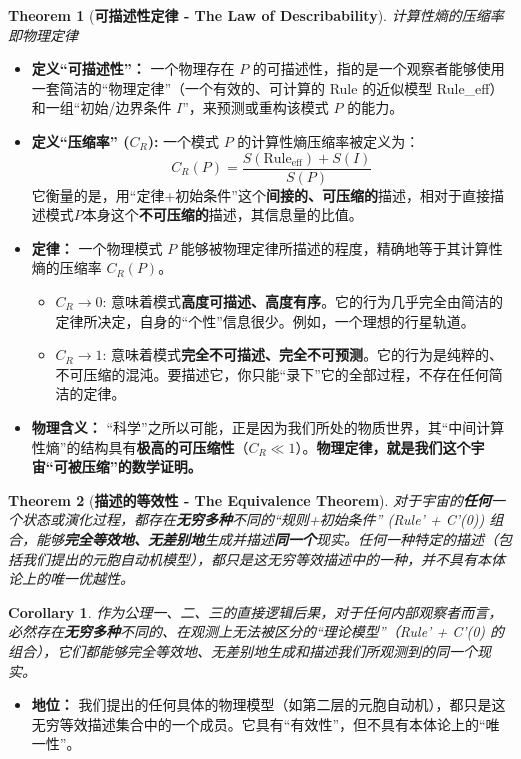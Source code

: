 \documentclass[11pt, a4paper]{article}
\newtheorem{theorem}{Theorem}[section]
\newtheorem{corollary}{Corollary}[section]
\begin{document}
\begin{theorem}[\textbf{可描述性定律 - The Law of Describability}]
计算性熵的压缩率即物理定律
\end{theorem}
\begin{itemize}
    \item \textbf{定义“可描述性”：} 一个物理存在 $P$ 的可描述性，指的是一个观察者能够使用一套简洁的“物理定律”（一个有效的、可计算的 Rule 的近似模型 Rule\_eff）和一组“初始/边界条件 $I$”，来预测或重构该模式 $P$ 的能力。
    \item \textbf{定义“压缩率” ($C_R$):} 一个模式 $P$ 的计算性熵压缩率被定义为：
    \[
    C_R(P) = \frac{S(\text{Rule}_{\text{eff}}) + S(I)}{S(P)}
    \]
    它衡量的是，用“定律+初始条件”这个\textbf{间接的、可压缩的}描述，相对于直接描述模式$P$本身这个\textbf{不可压缩的}描述，其信息量的比值。
    \item \textbf{定律：} 一个物理模式 $P$ 能够被物理定律所描述的程度，精确地等于其计算性熵的压缩率 $C_R(P)$。
    \begin{itemize}
        \item \textbf{$C_R \to 0$}: 意味着模式\textbf{高度可描述、高度有序}。它的行为几乎完全由简洁的定律所决定，自身的“个性”信息很少。例如，一个理想的行星轨道。
        \item \textbf{$C_R \to 1$}: 意味着模式\textbf{完全不可描述、完全不可预测}。它的行为是纯粹的、不可压缩的混沌。要描述它，你只能“录下”它的全部过程，不存在任何简洁的定律。
    \end{itemize}
    \item \textbf{物理含义：} “科学”之所以可能，正是因为我们所处的物质世界，其“中间计算性熵”的结构具有\textbf{极高的可压缩性}（$C_R \ll 1$）。\textbf{物理定律，就是我们这个宇宙“可被压缩”的数学证明。}
\end{itemize}

\begin{theorem}[\textbf{描述的等效性 - The Equivalence Theorem}]
对于宇宙的\textbf{任何}一个状态或演化过程，都存在\textbf{无穷多种}不同的“规则+初始条件” (Rule' + C'(0)) 组合，能够\textbf{完全等效地、无差别地}生成并描述\textbf{同一个}现实。任何一种特定的描述（包括我们提出的元胞自动机模型），都只是这无穷等效描述中的一种，并不具有本体论上的唯一优越性。
\end{theorem}
\begin{corollary}
作为公理一、二、三的直接逻辑后果，对于任何内部观察者而言，必然存在\textbf{无穷多种}不同的、在观测上无法被区分的“理论模型”（Rule' + C'(0) 的组合），它们都能够完全等效地、无差别地生成和描述我们所观测到的同一个现实。
\end{corollary}
\begin{itemize}
    \item \textbf{地位：} 我们提出的任何具体的物理模型（如第二层的元胞自动机），都只是这无穷等效描述集合中的一个成员。它具有“有效性”，但不具有本体论上的“唯一性”。
\end{itemize}
\end{document}
